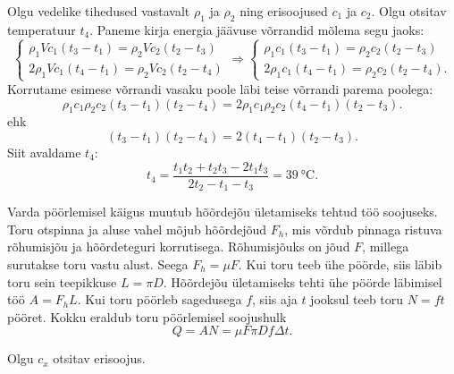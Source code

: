 \documentclass[10pt]{article}
\begin{document}
{
\solu
Olgu vedelike tihedused vastavalt $\rho_1$ ja $\rho_2$ ning erisoojused $c_1$ ja $c_2$. Olgu otsitav temperatuur $t_4$. Paneme kirja energia jäävuse võrrandid mõlema segu jaoks:
\[
\left\{\begin{array}{l}
	{\rho_{1} V c_{1}\left(t_{3}-t_{1}\right)=\rho_{2} V c_{2}\left(t_{2}-t_{3}\right)} \\ {2 \rho_{1} V c_{1}\left(t_{4}-t_{1}\right)=\rho_{2} V c_{2}\left(t_{2}-t_{4}\right)}\end{array} \Rightarrow\left\{\begin{array}{l}{\rho_{1} c_{1}\left(t_{3}-t_{1}\right)=\rho_{2} c_{2}\left(t_{2}-t_{3}\right)} \\ {2 \rho_{1} c_{1}\left(t_{4}-t_{1}\right)=\rho_{2} c_{2}\left(t_{2}-t_{4}\right).}
\end{array}\right.\right.
\]
Korrutame esimese võrrandi vasaku poole läbi teise võrrandi parema poolega:
\[
\rho_{1} c_{1} \rho_{2} c_{2}\left(t_{3}-t_{1}\right)\left(t_{2}-t_{4}\right) =2 \rho_{1} c_{1} \rho_{2} c_{2}\left(t_{4}-t_{1}\right)\left(t_{2}-t_{3}\right).
\]
ehk
\[
\left(t_{3}-t_{1}\right)\left(t_{2}-t_{4}\right) =2\left(t_{4}-t_{1}\right)\left(t_{2}-t_{3}\right).
\]
Siit avaldame $t_4$:
\[
t_{4}=\frac{t_{1} t_{2}+t_{2} t_{3}-2 t_{1} t_{3}}{2 t_{2}-t_{1}-t_{3}}=\SI{39}{\degreeCelsius}.
\]
\probend
\bigskip


\solu
Varda pöörlemisel käigus muutub hõõrdejõu ületamiseks tehtud töö soojuseks. Toru otspinna ja aluse vahel mõjub hõõrdejõud $F_h$, mis võrdub pinnaga ristuva rõhumisjõu ja hõõrdeteguri korrutisega. Rõhumisjõuks on jõud $F$, millega surutakse toru vastu alust. Seega $F_h = \mu F$. Kui toru teeb ühe pöörde, siis läbib toru sein teepikkuse $L = \pi D$. Hõõrdejõu ületamiseks tehti ühe pöörde läbimisel töö $A = F_hL$. Kui toru pöörleb sagedusega $f$, siis aja $t$ jooksul teeb toru $N = f t$ pööret. Kokku eraldub toru pöörlemisel soojushulk
\[
Q=A N=\mu F \pi D f \Delta t.
\]
\probend
\bigskip


\solu
Olgu $c_x$ otsitav erisoojus.

}
\end{document}
